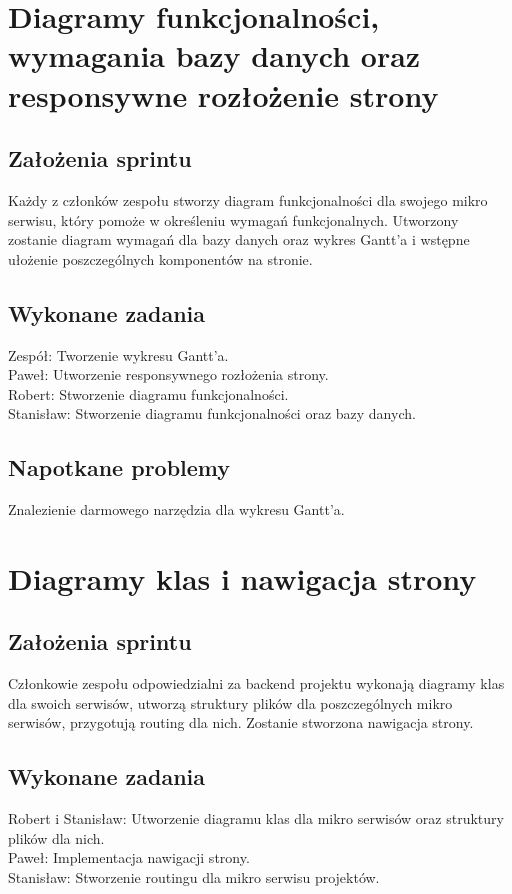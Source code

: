 \documentclass[a4paper,11pt]{report}
\begin{document}
\section {Diagramy funkcjonalności, wymagania bazy danych oraz responsywne rozłożenie strony}
\subsection {Założenia sprintu}
Każdy z członków zespołu stworzy diagram funkcjonalności dla swojego mikro serwisu, który pomoże w określeniu wymagań funkcjonalnych. Utworzony zostanie diagram wymagań dla bazy danych oraz wykres Gantt’a i wstępne ułożenie poszczególnych komponentów na stronie.
\subsection {Wykonane zadania}
Zespół: Tworzenie wykresu Gantt'a.\\
Paweł: Utworzenie responsywnego rozłożenia strony. \\
Robert: Stworzenie diagramu funkcjonalności. \\
Stanisław: Stworzenie diagramu funkcjonalności oraz bazy danych.\\
\subsection {Napotkane problemy}
Znalezienie darmowego narzędzia dla wykresu Gantt'a.

\section {Diagramy klas i nawigacja strony}
\subsection {Założenia sprintu}
Członkowie zespołu odpowiedzialni za backend projektu wykonają diagramy klas dla swoich serwisów, utworzą struktury plików dla poszczególnych mikro serwisów, przygotują routing dla nich. Zostanie stworzona nawigacja strony.
\subsection {Wykonane zadania}
Robert i Stanisław: Utworzenie diagramu klas dla mikro serwisów oraz struktury plików dla nich.\\
Paweł: Implementacja nawigacji strony. \\
Stanisław: Stworzenie routingu dla mikro serwisu projektów.\\
\end{document}
